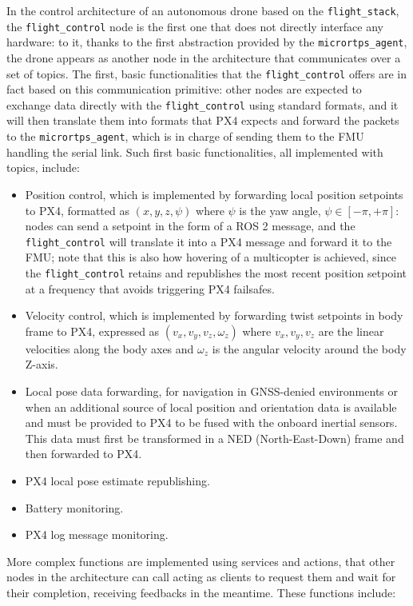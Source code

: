In the control architecture of an autonomous drone based on the \texttt{flight\_stack}, the \texttt{flight\_control} node is the first one that does not directly interface any hardware: to it, thanks to the first abstraction provided by the \texttt{micrortps\_agent}, the drone appears as another node in the architecture that communicates over a set of topics. The first, basic functionalities that the \texttt{flight\_control} offers are in fact based on this communication primitive: other nodes are expected to exchange data directly with the \texttt{flight\_control} using standard formats, and it will then translate them into formats that PX4 expects and forward the packets to the \texttt{micrortps\_agent}, which is in charge of sending them to the FMU handling the serial link. Such first basic functionalities, all implemented with topics, include:
\begin{itemize}
  \item Position control, which is implemented by forwarding local position setpoints to PX4, formatted as $(x,y,z,\psi)$ where $\psi$ is the yaw angle, $\psi\in[-\pi,+\pi]$: nodes can send a setpoint in the form of a ROS 2 message, and the \texttt{flight\_control} will translate it into a PX4 message and forward it to the FMU; note that this is also how hovering of a multicopter is achieved, since the \texttt{flight\_control} retains and republishes the most recent position setpoint at a frequency that avoids triggering PX4 failsafes.
  \item Velocity control, which is implemented by forwarding twist setpoints in body frame to PX4, expressed as $(v_x,v_y,v_z,\omega_z)$ where $v_x,v_y,v_z$ are the linear velocities along the body axes and $\omega_z$ is the angular velocity around the body Z-axis.
  \item Local pose data forwarding, for navigation in GNSS-denied environments or when an additional source of local position and orientation data is available and must be provided to PX4 to be fused with the onboard inertial sensors. This data must first be transformed in a NED (North-East-Down) frame and then forwarded to PX4.
  \item PX4 local pose estimate republishing.
  \item Battery monitoring.
  \item PX4 log message monitoring.
\end{itemize}
More complex functions are implemented using services and actions, that other nodes in the architecture can call acting as clients to request them and wait for their completion, receiving feedbacks in the meantime. These functions include:
